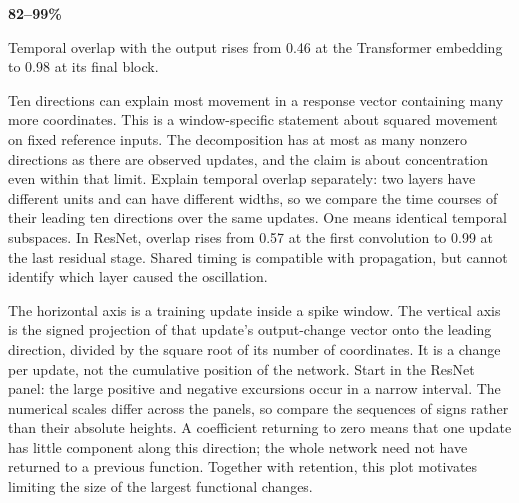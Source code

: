 {{\color{Teal}\fontsize{34}{38}\selectfont\bfseries 82--99\%}\par
{}
\vspace{3mm}
{\par Temporal overlap with the output rises from 0.46 at the Transformer embedding to 0.98 at its final block.}}
{Ten directions can explain most movement in a response vector containing many more coordinates. This is a window-specific statement about squared movement on fixed reference inputs. The decomposition has at most as many nonzero directions as there are observed updates, and the claim is about concentration even within that limit. Explain temporal overlap separately: two layers have different units and can have different widths, so we compare the time courses of their leading ten directions over the same updates. One means identical temporal subspaces. In ResNet, overlap rises from 0.57 at the first convolution to 0.99 at the last residual stage. Shared timing is compatible with propagation, but cannot identify which layer caused the oscillation.}

{
}
{The horizontal axis is a training update inside a spike window. The vertical axis is the signed projection of that update's output-change vector onto the leading direction, divided by the square root of its number of coordinates. It is a change per update, not the cumulative position of the network. Start in the ResNet panel: the large positive and negative excursions occur in a narrow interval. The numerical scales differ across the panels, so compare the sequences of signs rather than their absolute heights. A coefficient returning to zero means that one update has little component along this direction; the whole network need not have returned to a previous function. Together with retention, this plot motivates limiting the size of the largest functional changes.}

